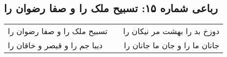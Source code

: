 \begin{center}
\section*{رباعی شماره ۱۵: تسبیح ملک را و صفا رضوان را}
\label{sec:sh015}
\begin{longtable}{l p{0.5cm} r}
تسبیح ملک را و صفا رضوان را
&&
دوزخ بد را بهشت مر نیکان را
\\
دیبا جم را و قیصر و خاقان را
&&
جانان ما را و جان ما جانان را
\\
\end{longtable}
\end{center}
